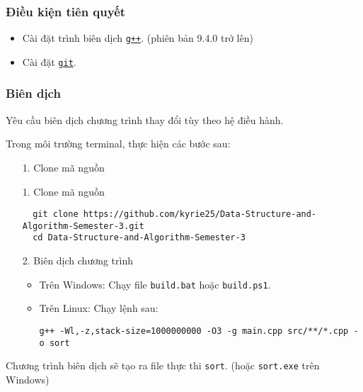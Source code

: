 \subsubsection{Điều kiện tiên quyết}
\begin{itemize}
  \item Cài đặt trình biên dịch \href{https://gcc.gnu.org/}{\texttt{g++}}. (phiên bản 9.4.0 trở lên)
  \item Cài đặt \href{https://git-scm.com/}{\texttt{git}}.
\end{itemize}

\subsubsection{Biên dịch}

Yêu cầu biên dịch chương trình thay đổi tùy theo hệ điều hành.

Trong môi trường terminal, thực hiện các bước sau:
\begin{itemize}
  \item[1.] Clone mã nguồn
  \item[1.] Clone mã nguồn
  \begin{verbatim}
  git clone https://github.com/kyrie25/Data-Structure-and-Algorithm-Semester-3.git
  cd Data-Structure-and-Algorithm-Semester-3
  \end{verbatim}
  \item[2.] Biên dịch chương trình
  \begin{itemize}
    \item Trên Windows:
    Chạy file \texttt{build.bat} hoặc \texttt{build.ps1}. 
    \newpage
    \item Trên Linux:
    Chạy lệnh sau:
\begin{verbatim}
g++ -Wl,-z,stack-size=1000000000 -O3 -g main.cpp src/**/*.cpp -o sort 
\end{verbatim}
  \end{itemize}
\end{itemize}

Chương trình biên dịch sẽ tạo ra file thực thi \texttt{sort}. (hoặc \texttt{sort.exe} trên Windows)

\newpage